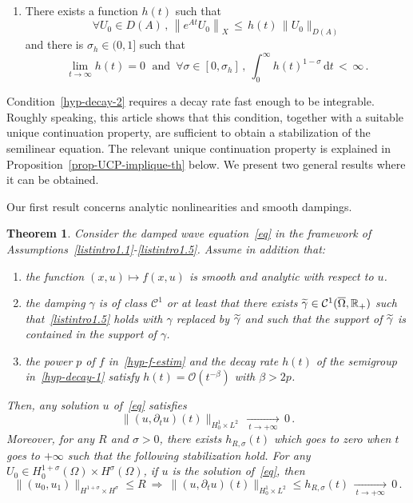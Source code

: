 \documentclass[10pt]{amsart}
\newtheorem{theo}{Theorem}[section]
\theoremstyle{definition}\newtheorem{defi}[theo]{Definition}\newtheorem{rema}[theo]{Remark}\newtheorem{exam}[theo]{Example}\newtheorem{exem}[theo]{Example}\newtheorem{nota}[theo]{Notation}
\newcommand{\RR}{\mathbb{R}}
\newcommand{\Cc}{\mathcal{C}}
\newcommand{\Oc}{\mathcal{O}}
\newcommand{\drm}{\mathrm{d}}
\newcommand*{\romanenumi}{\renewcommand*{\theenumi}{\roman{enumi}}}
\newcommand*{\alphenumi}{\renewcommand*{\theenumi}{\alph{enumi}}}
\let\oldtilde\tilde
\renewcommand*{\tilde}[1]{\mathchoice{\widetilde{#1}}{\widetilde{#1}}{\oldtilde{#1}}{\oldtilde{#1}}}\let\oldexists\exists
\renewcommand*{\exists}{\mathrel{\oldexists}}
\let\oldforall\forall
\renewcommand*{\forall}{\mathrel{\oldforall}}
\begin{document}
\begingroup
\begin{enumerate}\romanenumi
\setcounter{enumi}{4}
\item \label{listintro1.5}There exists a function $h(t)$ such that
\begin{equation}\label{hyp-decay-1}
\forall U_0\in D(A)\,,\,\left\|e^{At}U_0\right\|_X \, \leq \, h(t)\,\|U_0\|_{D(A)}
\end{equation}
and there is $\sigma_h\in(0,1]$ such that
\begin{equation}\label{hyp-decay-2}
\lim_{t\rightarrow \infty}h(t)=0\;\text{ and }\,
\forall \sigma\in[0,\sigma_h]\,,\:\int_0^\infty h(t)^{1-\sigma}\,\drm t\,<\,\infty\,.
\end{equation}
\end{enumerate}
\endgroup
Condition~\eqref{hyp-decay-2} requires a decay rate fast enough to be integrable. Roughly speaking, this article shows that this condition, together with a suitable unique continuation property, are sufficient to obtain a stabilization of the semilinear equation. The relevant unique continuation property is explained in Proposition~\ref{prop-UCP-implique-th} below. We present two general results where it can be obtained.

Our first result concerns analytic nonlinearities and smooth dampings.

\begin{theo}\label{th1}
Consider the damped wave equation~\eqref{eq} in the framework of Assumptions~\eqref{listintro1.1}-\eqref{listintro1.5}. Assume in addition that:
\begin{enumerate}\alphenumi
\item \label{listtheo1.1.1}the function $(x,u)\mapsto f(x,u)$ is smooth and analytic with respect to $u$.
\item \label{listtheo1.1.2}the damping $\gamma$ is of class $\Cc^1$ or at least that there exists $\tilde\gamma\in\Cc^1(\overline\Omega,\RR_+)$ such that~\eqref{listintro1.5} holds with $\gamma$ replaced by $\tilde\gamma$ and such that the support of $\tilde\gamma$ is contained in the support of $\gamma$.
\item \label{listtheo1.1.3}the power $p$ of $f$ in~\eqref{hyp-f-estim} and the decay rate $h(t)$ of the semigroup in~\eqref{hyp-decay-1} satisfy $h(t)=\Oc(t^{-\beta})$ with $\beta>2p$.
\end{enumerate}
Then, any solution $u$ of~\eqref{eq} satisfies
\[
\|(u,\partial_t u)(t)\|_{H^1_0\times L^2}\,\xrightarrow[\:t\longrightarrow
+\infty\:]{}\,0\,.
\]
Moreover, for any $R$ and $\sigma>0$, there exists $h_{R,\sigma}(t)$ which goes to zero when $t$ goes to $+\infty$ such that the following stabilization hold. For any $U_0\in H^{1+\sigma}_0(\Omega)\times H^\sigma(\Omega)$, if $u$ is the solution of~\eqref{eq}, then
\[
\|(u_0,u_1)\|_{H^{1+\sigma}\times H^\sigma}\leq
R\:\Longrightarrow\:\|(u,\partial_t u)(t)\|_{H^1_0\times L^2} \leq
h_{R,\sigma}(t)\,\xrightarrow[\:t\longrightarrow +\infty\:]{}\,0\,.
\]
\end{theo}
\end{document}
